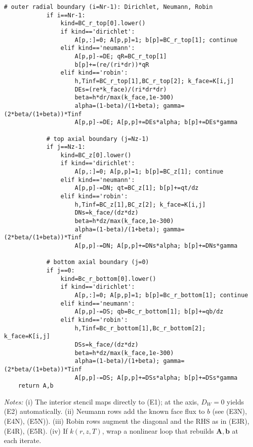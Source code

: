 \documentclass[11pt]{article}
\begin{document}
\begin{lstlisting}[caption={Bare-bones Python builder for the steady $(r,z)$ conduction system},label={lst:construct_system}]
            # outer radial boundary (i=Nr-1): Dirichlet, Neumann, Robin
            if i==Nr-1:
                kind=BC_r_top[0].lower()
                if kind=='dirichlet':
                    A[p,:]=0; A[p,p]=1; b[p]=BC_r_top[1]; continue
                elif kind=='neumann':
                    A[p,p]-=DE; qR=BC_r_top[1]
                    b[p]+=(re/(ri*dr))*qR
                elif kind=='robin':
                    h,Tinf=BC_r_top[1],BC_r_top[2]; k_face=K[i,j]
                    DEs=(re*k_face)/(ri*dr*dr)
                    beta=h*dr/max(k_face,1e-300)
                    alpha=(1-beta)/(1+beta); gamma=(2*beta/(1+beta))*Tinf
                    A[p,p]-=DE; A[p,p]+=DEs*alpha; b[p]+=DEs*gamma

            # top axial boundary (j=Nz-1)
            if j==Nz-1:
                kind=BC_z[0].lower()
                if kind=='dirichlet':
                    A[p,:]=0; A[p,p]=1; b[p]=BC_z[1]; continue
                elif kind=='neumann':
                    A[p,p]-=DN; qt=BC_z[1]; b[p]+=qt/dz
                elif kind=='robin':
                    h,Tinf=BC_z[1],BC_z[2]; k_face=K[i,j]
                    DNs=k_face/(dz*dz)
                    beta=h*dz/max(k_face,1e-300)
                    alpha=(1-beta)/(1+beta); gamma=(2*beta/(1+beta))*Tinf
                    A[p,p]-=DN; A[p,p]+=DNs*alpha; b[p]+=DNs*gamma

            # bottom axial boundary (j=0)
            if j==0:
                kind=Bc_r_bottom[0].lower()
                if kind=='dirichlet':
                    A[p,:]=0; A[p,p]=1; b[p]=Bc_r_bottom[1]; continue
                elif kind=='neumann':
                    A[p,p]-=DS; qb=Bc_r_bottom[1]; b[p]+=qb/dz
                elif kind=='robin':
                    h,Tinf=Bc_r_bottom[1],Bc_r_bottom[2]; k_face=K[i,j]
                    DSs=k_face/(dz*dz)
                    beta=h*dz/max(k_face,1e-300)
                    alpha=(1-beta)/(1+beta); gamma=(2*beta/(1+beta))*Tinf
                    A[p,p]-=DS; A[p,p]+=DSs*alpha; b[p]+=DSs*gamma
    return A,b
\end{lstlisting}

\noindent\emph{Notes:} 
(i) The interior stencil maps directly to (E1); at the axis, \(D_W=0\) yields (E2) automatically. 
(ii) Neumann rows add the known face flux to \(b\) (see (E3N), (E4N), (E5N)). 
(iii) Robin rows augment the diagonal and the RHS as in (E3R), (E4R), (E5R). 
(iv) If \(k(r,z,T)\), wrap a nonlinear loop that rebuilds \(\mathbf{A},\mathbf{b}\) at each iterate.
\end{document}
